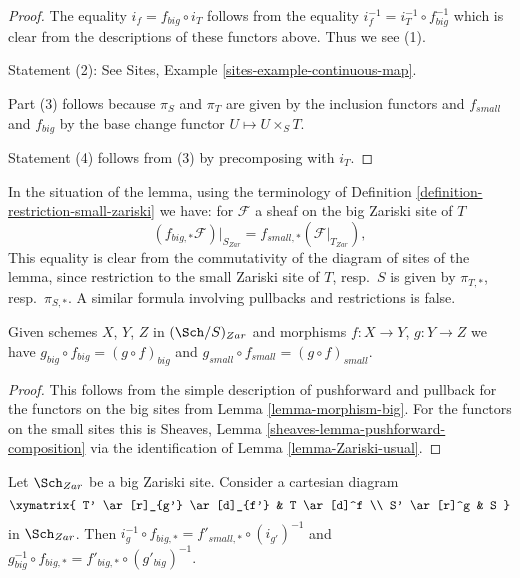 \begin{proof}
The equality $i_f = f_{big} \circ i_T$ follows from the
equality $i_f^{-1} = i_T^{-1} \circ f_{big}^{-1}$ which is
clear from the descriptions of these functors above.
Thus we see (1).

\medskip\noindent
Statement (2): See Sites, Example \ref{sites-example-continuous-map}.

\medskip\noindent
Part (3) follows because $\pi_S$ and $\pi_T$ are given by
the inclusion functors and $f_{small}$ and $f_{big}$ by the
base change functor $U \mapsto U \times_S T$.

\medskip\noindent
Statement (4) follows from (3) by precomposing with $i_T$.
\end{proof}

\noindent
In the situation of the lemma, using the terminology of
Definition \ref{definition-restriction-small-zariski}
we have: for $\mathcal{F}$ a sheaf on the big Zariski site of $T$
$$
(f_{big, *}\mathcal{F})|_{S_{Zar}} =
f_{small, *}(\mathcal{F}|_{T_{Zar}}),
$$
This equality is clear from the commutativity of the diagram of
sites of the lemma, since restriction to the small Zariski site of
$T$, resp.\ $S$ is given by $\pi_{T, *}$, resp.\ $\pi_{S, *}$. A similar
formula involving pullbacks and restrictions is false.

\begin{lemma}
\label{lemma-composition}
Given schemes $X$, $Y$, $Z$ in $(\Sch/S)_{Zar}$
and morphisms $f : X \to Y$, $g : Y \to Z$ we have
$g_{big} \circ f_{big} = (g \circ f)_{big}$ and
$g_{small} \circ f_{small} = (g \circ f)_{small}$.
\end{lemma}

\begin{proof}
This follows from the simple description of pushforward
and pullback for the functors on the big sites from
Lemma \ref{lemma-morphism-big}. For the functors
on the small sites this is
Sheaves, Lemma \ref{sheaves-lemma-pushforward-composition}
via the identification of Lemma \ref{lemma-Zariski-usual}.
\end{proof}

\begin{lemma}
\label{lemma-morphism-big-small-cartesian-diagram}
Let $\Sch_{Zar}$ be a big Zariski site. Consider a cartesian diagram
$$
\xymatrix{
T' \ar[r]_{g'} \ar[d]_{f'} & T \ar[d]^f \\
S' \ar[r]^g & S
}
$$
in $\Sch_{Zar}$. Then
$i_g^{-1} \circ f_{big, *} = f'_{small, *} \circ (i_{g'})^{-1}$
and $g_{big}^{-1} \circ f_{big, *} = f'_{big, *} \circ (g'_{big})^{-1}$.
\end{lemma}

